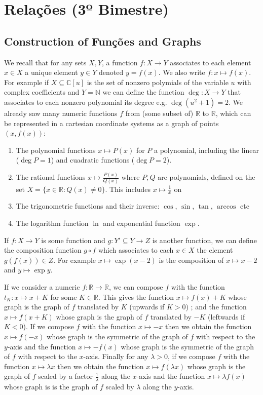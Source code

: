 \chapter{Relações (3º Bimestre)}

\section{Construction of Funções and Graphs}

We recall that for any sets $X, Y$, a function $f: X \rightarrow Y$ associates
to each element $x \in X$ a unique element $y \in Y$ denoted $y = f(x)$.
We also write $f: x \mapsto f(x)$.
For example if $X \subseteq {\mathbb C}{[u]}$ is the set of nonzero polymials
of the variable $u$ with complex coefficients and $Y=\mathbb N$ we can define
the function $\deg: X \rightarrow Y$ that associates to each nonzero polynomial
its degree e.g. $\deg(u^2 + 1) = 2$. We already saw many numeric functions $f$
from (some subset of) $\mathbb R$ to $\mathbb R$, which can be represented
in a cartesian coordinate systems as a graph of points $(x,f(x))$:

\begin{enumerate}
\item The polynomial functions $x \mapsto P(x)$ for $P$ a polynomial,
  including the linear ($\deg P = 1$) and cuadratic functions ($\deg P = 2$).
\item The rational functions $x \mapsto \frac{P(x)}{Q(x)}$ where
  $P,Q$ are polynomials, defined on the set
  $X = \{ x \in \mathbb R : Q(x) \neq 0 \}$. This includes
  $x \mapsto \frac{1}{x}$ on
\item The trigonometric functions and their inverse:  $\cos$, $\sin$, $\tan$,
  $\arccos$ etc
\item The logarithm function $\ln$ and exponential function $\exp$.
\end{enumerate}

If $f: X \rightarrow Y$ is some function and $g: Y' \subseteq Y \rightarrow Z$
is another function, we can define the composition function $g \circ f$
which associates to each $x \in X$ the element $g(f(x)) \in Z$. For example
$x \mapsto \exp{(x-2)}$ is the composition of $x \mapsto x-2$ and
$y \mapsto \exp{y}$.

If we consider a numeric $f: \mathbb R \rightarrow \mathbb R$,
we can compose $f$ with the function $t_K: x \mapsto x + K$ for some
$K \in \mathbb R$. This gives the function $x \mapsto f(x) + K$ whose graph
is the graph of $f$ translated by $K$ (upwards if $K>0$) ; and the function
$x \mapsto f(x+K)$ whose graph is the graph of $f$ translated by $-K$
(leftwards if $K<0$). If we compose $f$ with the function $x \mapsto -x$
then we obtain the function $x \mapsto f(-x)$ whose graph is
the symmetric of the graph of $f$ with respect to the $y$-axis and
the function $x \mapsto -f(x)$ whose graph is
the symmetric of the graph of $f$ with respect to the $x$-axis.
Finally for any $\lambda > 0$, if we compose $f$ with the function
$x \mapsto \lambda x$ then we obtain the function $x \mapsto f(\lambda x)$ whose
graph is the graph of $f$ scaled by a factor $\frac{1}{\lambda}$ along the
$x$-axis and the function $x \mapsto \lambda f(x)$ whose graph is
is the graph of $f$ scaled by $\lambda$ along the $y$-axis.

